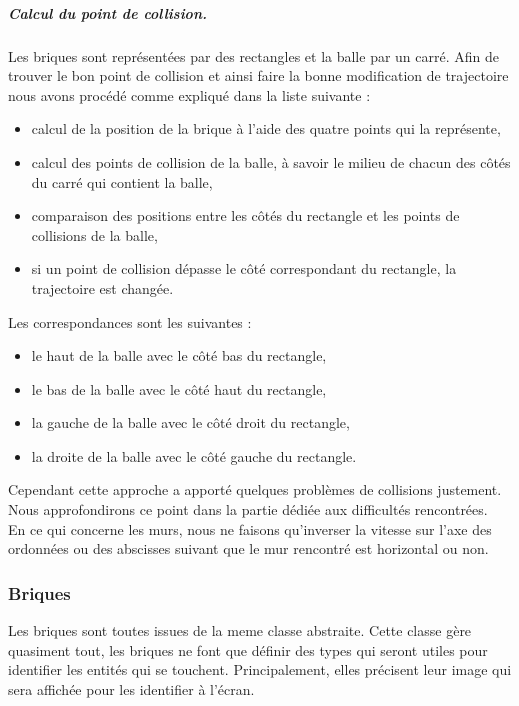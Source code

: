 \documentclass[a4paper,10pt]{article}
\begin{document}
		\subparagraph{Calcul du point de collision.}
		Les briques sont représentées par des rectangles et la balle par un carré.
		Afin de trouver le bon point de collision et ainsi faire la bonne modification de trajectoire nous avons procédé comme expliqué dans la liste
		suivante :
		\begin{itemize}
		\item calcul de la position de la brique à l'aide des quatre points qui la représente,
		\item calcul des points de collision de la balle, à savoir le milieu de chacun des côtés du carré qui contient la balle,
		\item comparaison des positions entre les côtés du rectangle et les points de collisions de la balle,
		\item si un point de collision dépasse le côté correspondant du rectangle, la trajectoire est changée. \\
		\end{itemize}
		Les correspondances sont les suivantes :
		\begin{itemize}
		\item le haut de la balle avec le côté bas du rectangle,
		\item le bas de la balle avec le côté haut du rectangle,
		\item la gauche de la balle avec le côté droit du rectangle,
		\item la droite de la balle avec le côté gauche du rectangle. \\
		\end{itemize}
		Cependant cette approche a apporté quelques problèmes de collisions justement. Nous approfondirons ce point
		dans la partie dédiée aux difficultés rencontrées. \\

        En ce qui concerne les murs, nous ne faisons qu'inverser la vitesse sur l'axe des ordonnées ou des abscisses suivant
        que le mur rencontré est horizontal ou non.


    \subsubsection{Briques}
        Les briques sont toutes issues de la meme classe abstraite. Cette classe gère quasiment tout, les briques ne font
        que définir des types qui seront utiles pour identifier les entités qui se touchent. Principalement, elles
        précisent leur image qui sera affichée pour les identifier à l'écran. \\
\end{document}

